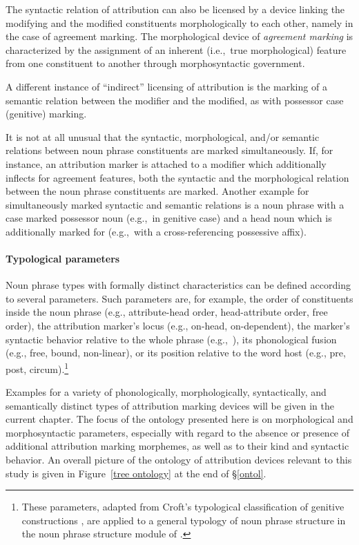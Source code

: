 The syntactic relation of attribution can also be licensed by a device linking the modifying and the modified constituents morphologically to each other, namely in the case of agreement marking. The morphological device of \emph{agreement marking} is characterized by the assignment of an inherent (i.e.,~true morphological) feature from one constituent to another through morphosyntactic government.

A different instance of “indirect” licensing of attribution is the marking of a semantic relation between the modifier and the modified, as with possessor case (genitive) marking.

It is not at all unusual that the syntactic, morphological, and/or semantic relations between noun phrase constituents are marked simultaneously. If, for instance, an attribution marker is attached to a modifier which additionally inflects for agreement features, both the syntactic and the morphological relation between the noun phrase constituents are marked. Another example for simultaneously marked syntactic and semantic relations is a noun phrase with a case marked possessor noun (e.g.,~in genitive case) and a head noun which is additionally marked for  (e.g.,~with a cross-referencing possessive affix).

\paragraph*{Typological parameters} 
Noun phrase types with formally distinct characteristics can be defined according to several parameters. Such parameters are, for example, the order of constituents inside the noun phrase (e.g., attribute-head order, head-attribute order, free order), the attribution marker's locus (e.g., on-head, on-dependent), the marker's syntactic behavior relative to the whole phrase (e.g.,~), its phonological fusion (e.g., free, bound, non-linear), or its position relative to the word host (e.g., pre, post, circum).\footnote{These parameters, adapted from Croft's typological classification of genitive constructions \citep[93–94]{croft1995}, are applied to a general typology of noun phrase structure in the noun phrase structure module of  \citep[cf.][]{AUTOTYP-NP}.}

Examples for a variety of phonologically, morphologically, syntactically, and semantically distinct types of attribution marking devices will be given in the current chapter. The focus of the ontology presented here is on morphological and morphosyntactic parameters, especially with regard to the absence or presence of additional attribution marking morphemes, as well as to their kind and syntactic behavior. An overall picture of the ontology of attribution devices relevant to this study is given in Figure~\ref{tree ontology} at the end of \S\ref{ontol}.

